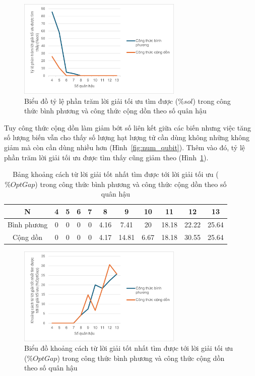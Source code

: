 \begin{figure}[H]
	\centering
	\includegraphics[width=0.7\textwidth]{images/methods/sol.png}
	\caption{Biểu đồ tỷ lệ phần trăm lời giải tối ưu tìm được ($\%sol$) trong công thức bình phương và công thức cộng dồn theo số quân hậu}
	\label{fig:methods/sol}
\end{figure}

Tuy công thức cộng dồn làm giảm bớt số liên kết giữa các biến nhưng việc tăng số lượng biến vẫn cho thấy số lượng hạt lượng tử cần dùng không những không giảm mà còn cần dùng nhiều hơn (Hình~\ref{fig:num_qubit}). Thêm vào đó, tỷ lệ phần trăm lời giải tối ưu được tìm thấy cũng giảm theo (Hình~\ref{fig:methods/sol}).

\begin{table}[H]
	\centering
	\begin{tabular}{|c|c|c|c|c|c|c|c|c|c|c|}
		\hline
		N & 4 & 5 & 6 & 7 & 8 & 9 & 10 & 11 & 12 & 13 \\
		\hline
		Bình phương & 0 & 0 & 0 & 0 & 4.16 & 7.41 & 20 & 18.18 & 22.22 & 25.64 \\
		\hline
		Cộng dồn & 0 & 0 & 0 & 0 & 4.17 & 14.81 & 6.67 & 18.18 & 30.55 & 25.64 \\
		\hline
	\end{tabular}
	
	
	\caption{Bảng khoảng cách từ lời giải tốt nhất tìm được tới lời giải tối ưu ($\%OptGap$) trong công thức bình phương và công thức cộng dồn theo số quân hậu}
	\label{tab:methods/optgap}
\end{table}

\begin{figure}[H]
	\centering
	\includegraphics[width=0.7\textwidth]{images/methods/optgap.png}
	\caption{Biểu đồ khoảng cách từ lời giải tốt nhất tìm được tới lời giải tối ưu ($\%OptGap$) trong công thức bình phương và công thức cộng dồn theo số quân hậu}
	\label{fig:methods/optgap}
\end{figure}

